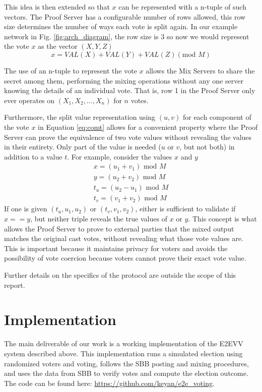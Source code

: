 \documentclass{article}
\begin{document}
This idea is then extended so that $x$ can be represented with a n-tuple of such vectors. The Proof Server has a configurable number of rows allowed, this row size determines the number of ways each vote is split again. In our example network in Fig. \ref{fig:arch_diagram}, the row size is $3$ so now we would represent the vote $x$ as the vector $(X, Y, Z)$
\begin{equation} \label{eq:comt}
    x = \mathit{VAL}(X) + \mathit{VAL}(Y) + \mathit{VAL}(Z) (\mbox{mod } M)
\end{equation}

The use of an n-tuple to represent the vote $x$ allows the Mix Servers to share the secret among them, performing the mixing operations without any one server knowing the details of an individual vote. That is, row 1 in the Proof Server only ever operates on $(X_1, X_2, \dots, X_n)$ for $n$ votes.

Furthermore, the split value representation using $(u, v)$ for each component of the vote $x$ in Equation \ref{eq:comt} allows for a convenient property where the Proof Server can prove the equivalence of two vote values without revealing the values in their entirety. Only part of the value is needed ($u$ or $v$, but not both) in addition to a value $t$. For example, consider the values $x$ and $y$
\begin{align*} \label{eq:comt}
    x = (u_1 + v_1) \mbox{ mod } M \\
    y = (u_2 + v_2) \mbox{ mod } M \\
    t_u = (u_2 - u_1) \mbox{ mod } M \\
    t_v = (v_1 + v_2) \mbox{ mod } M
\end{align*}
If one is given $(t_u, u_1, u_2)$ or $(t_v, v_1, v_2)$, either is sufficient to validate if $x == y$, but neither triple reveals the true values of $x$ or $y$. This concept is what allows the Proof Server to prove to external parties that the mixed output matches the original cast votes, without revealing what those vote values are. This is important because it maintains privacy for voters and avoids the possibility of vote coercion because voters cannot prove their exact vote value.

Further details on the specifics of the protocol are outside the scope of this report.

\section{Implementation}
The main deliverable of our work is a working implementation of the E2EVV system described above. This implementation runs a simulated election using randomized voters and voting, follows the SBB posting and mixing procedures, and uses the data from SBB to verify votes and compute the election outcome. The code can be found here: \url{https://github.com/keyan/e2e_voting}.
\end{document}
